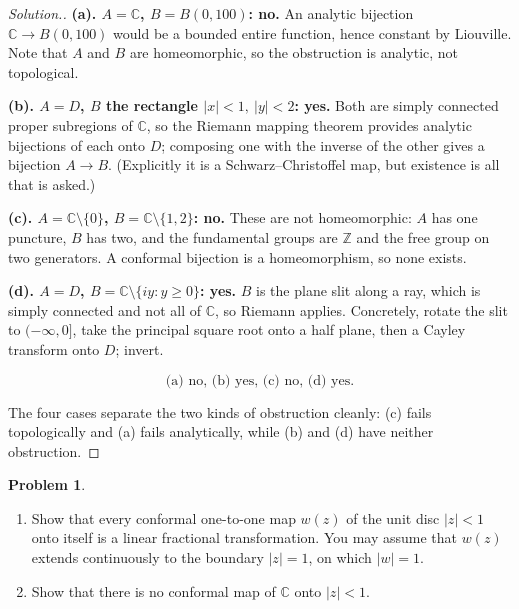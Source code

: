 \documentclass[11pt,a4paper]{article}
\theoremstyle{definition}
\newtheorem{problemx}{Problem}[section]
\newenvironment{problem}{\begin{problemx}}{\end{problemx}}
\newenvironment{solution}
  {\renewcommand{\qedsymbol}{}\begin{proof}[\textit{Solution}.]}
  {\end{proof}}
\begin{document}
\begin{solution}
\textbf{(a). $A = \mathbb{C}$, $B = B(0,100)$: no.} An analytic bijection
$\mathbb{C} \rightarrow B(0,100)$ would be a bounded entire function, hence
constant by Liouville. Note that $A$ and $B$ are homeomorphic, so the obstruction
is analytic, not topological.

\textbf{(b). $A = D$, $B$ the rectangle
$\left|x\right|<1,\ \left|y\right|<2$: yes.} Both are simply connected proper
subregions of $\mathbb{C}$, so the Riemann mapping theorem provides analytic
bijections of each onto $D$; composing one with the inverse of the other gives a
bijection $A \rightarrow B$. (Explicitly it is a Schwarz--Christoffel map, but
existence is all that is asked.)

\textbf{(c). $A = \mathbb{C}\setminus\{0\}$, $B = \mathbb{C}\setminus\{1,2\}$: no.}
These are not homeomorphic: $A$ has one puncture, $B$ has two, and the fundamental
groups are $\mathbb{Z}$ and the free group on two generators. A conformal bijection
is a homeomorphism, so none exists.

\textbf{(d). $A = D$, $B = \mathbb{C}\setminus\{iy : y \geq 0\}$: yes.} $B$ is the
plane slit along a ray, which is simply connected and not all of $\mathbb{C}$, so
Riemann applies. Concretely, rotate the slit to $(-\infty,0]$, take the principal
square root onto a half plane, then a Cayley transform onto $D$; invert.

$$\boxed{\text{(a) no, (b) yes, (c) no, (d) yes.}}$$

The four cases separate the two kinds of obstruction cleanly: (c) fails
topologically and (a) fails analytically, while (b) and (d) have neither
obstruction.
\end{solution}


\begin{problem}
\begin{enumerate}
\item[(a).] Show that every conformal one-to-one map $w(z)$ of the unit disc
$\left|z\right| < 1$ onto itself is a linear fractional transformation. You may
assume that $w(z)$ extends continuously to the boundary $\left|z\right| = 1$, on
which $\left|w\right| = 1$.
\item[(b).] Show that there is no conformal map of $\mathbb{C}$ onto
$\left|z\right| < 1$.
\end{enumerate}
\end{problem}
\end{document}
